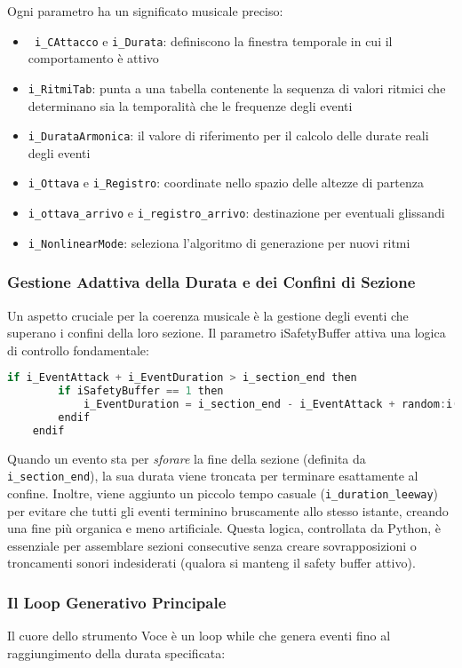 Ogni parametro ha un significato musicale preciso:

\begin{itemize}
    \item \texttt{ i\_CAttacco}  e \texttt{i\_Durata}: definiscono la finestra temporale in cui il comportamento è attivo
    \item \texttt{i\_RitmiTab}: punta a una tabella contenente la sequenza di valori ritmici che determinano sia la temporalità che le frequenze degli eventi
    \item \texttt{i\_DurataArmonica}: il valore di riferimento per il calcolo delle durate reali degli eventi
    \item \texttt{i\_Ottava} e \texttt{i\_Registro}: coordinate nello spazio delle altezze di partenza
    \item \texttt{i\_ottava\_arrivo} e \texttt{i\_registro\_arrivo}: destinazione per eventuali glissandi
    \item \texttt{i\_NonlinearMode}: seleziona l'algoritmo di generazione per nuovi ritmi
\end{itemize}
\subsubsection{Gestione Adattiva della Durata e dei Confini di Sezione}
Un aspetto cruciale per la coerenza musicale è la gestione degli eventi che superano i confini della loro sezione. Il parametro iSafetyBuffer attiva una logica di controllo fondamentale:

\begin{lstlisting}[language=C]
    if i_EventAttack + i_EventDuration > i_section_end then 
        if iSafetyBuffer == 1 then
            i_EventDuration = i_section_end - i_EventAttack + random:i(0, i_duration_leeway)
        endif
    endif
\end{lstlisting}

Quando un evento sta per \textit{sforare} la fine della sezione (definita da \texttt{i\_section\_end}), la sua durata viene troncata per terminare esattamente al confine. Inoltre, viene aggiunto un piccolo tempo casuale (\texttt{i\_duration\_leeway}) per evitare che tutti gli eventi terminino bruscamente allo stesso istante, creando una fine più organica e meno artificiale. Questa logica, controllata da Python, è essenziale per assemblare sezioni consecutive senza creare sovrapposizioni o troncamenti sonori indesiderati (qualora si manteng il safety buffer attivo).
\subsubsection{Il Loop Generativo Principale}
Il cuore dello strumento Voce è un loop while che genera eventi fino al raggiungimento della durata specificata:

